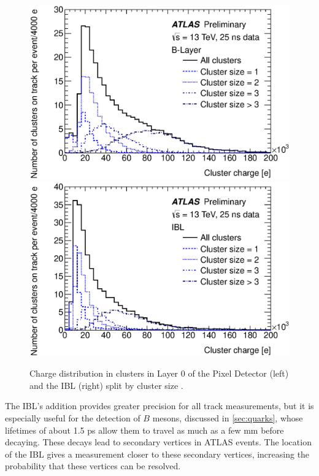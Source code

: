 \begin{centering}
\begin{figure}[!htb]
\myfloatalign
\includegraphics[width=.90\linewidth]{figures/atlas/fig_02.eps}
\includegraphics[width=.90\linewidth]{figures/atlas/fig_03.eps}
\caption{ Charge distribution in clusters in Layer 0 of the Pixel Detector (left) and the \ac{IBL} (right) split by cluster size \cite{pixibl}.}
\label{fig:ibl_pix_tot}
\end{figure}
\end{centering}

The \ac{IBL}'s addition provides greater precision for all track measurements, but it is especially useful for the detection of $B$ mesons, discussed in \autoref{sec:quarks}, whose lifetimes of about 1.5 ps allow them to travel as much as a few mm before decaying. These decays lead to secondary vertices in \ac{ATLAS} events. The location of the \ac{IBL} gives a measurement closer to these secondary vertices, increasing the probability that these vertices can be resolved. 

